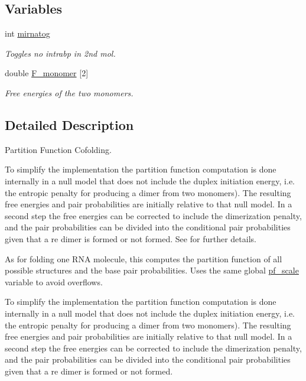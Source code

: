 \subsection*{Variables}
\begin{DoxyCompactItemize}
\item 
int \hyperlink{group__pf__cofold_gaff27888c4088cc1f60fd59cbd589474c}{mirnatog}\hypertarget{group__pf__cofold_gaff27888c4088cc1f60fd59cbd589474c}{}\label{group__pf__cofold_gaff27888c4088cc1f60fd59cbd589474c}

\begin{DoxyCompactList}\small\item\em Toggles no intrabp in 2nd mol. \end{DoxyCompactList}\item 
double \hyperlink{group__pf__cofold_gac2d1851a710a8561390861155ca988fe}{F\+\_\+monomer} \mbox{[}2\mbox{]}\hypertarget{group__pf__cofold_gac2d1851a710a8561390861155ca988fe}{}\label{group__pf__cofold_gac2d1851a710a8561390861155ca988fe}

\begin{DoxyCompactList}\small\item\em Free energies of the two monomers. \end{DoxyCompactList}\end{DoxyCompactItemize}


\subsection{Detailed Description}
Partition Function Cofolding. 

To simplify the implementation the partition function computation is done internally in a null model that does not include the duplex initiation energy, i.\+e. the entropic penalty for producing a dimer from two monomers). The resulting free energies and pair probabilities are initially relative to that null model. In a second step the free energies can be corrected to include the dimerization penalty, and the pair probabilities can be divided into the conditional pair probabilities given that a re dimer is formed or not formed. See \cite{bernhart:2006} for further details.

As for folding one R\+NA molecule, this computes the partition function of all possible structures and the base pair probabilities. Uses the same global \hyperlink{group__model__details_gad3b22044065acc6dee0af68931b52cfd}{pf\+\_\+scale} variable to avoid overflows.

To simplify the implementation the partition function computation is done internally in a null model that does not include the duplex initiation energy, i.\+e. the entropic penalty for producing a dimer from two monomers). The resulting free energies and pair probabilities are initially relative to that null model. In a second step the free energies can be corrected to include the dimerization penalty, and the pair probabilities can be divided into the conditional pair probabilities given that a re dimer is formed or not formed.

